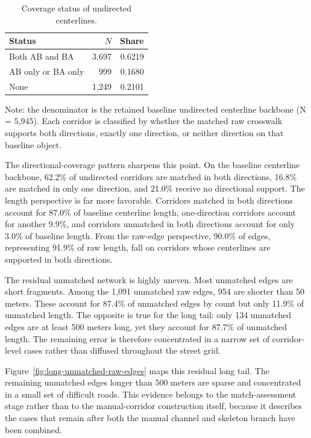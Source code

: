 \documentclass[12pt]{article}
\begin{document}
	\begin{table}[h!]
		\centering
		\caption{Coverage status of undirected centerlines.}
		\label{tab:undirected-coverage}
		\begin{tabular}{l r r}
			\toprule
			Status & $N$ & Share \\
			\midrule
			Both AB and BA & 3,697 & 0.6219 \\
			AB only or BA only & 999 & 0.1680 \\
			None & 1,249 & 0.2101 \\
			\bottomrule
		\end{tabular}
		\vspace{0.3em}
		\begin{minipage}{\textwidth}
			\footnotesize
			\raggedright
			Note: the denominator is the retained baseline undirected centerline backbone (N = 5,945). Each corridor is classified by whether the matched raw crosswalk supports both directions, exactly one direction, or neither direction on that baseline object.
		\end{minipage}
	\end{table}
	
	The directional-coverage pattern sharpens this point. On the baseline centerline backbone, 62.2\% of undirected corridors are matched in both directions, 16.8\% are matched in only one direction, and 21.0\% receive no directional support. The length perspective is far more favorable. Corridors matched in both directions account for 87.0\% of baseline centerline length, one-direction corridors account for another 9.9\%, and corridors unmatched in both directions account for only 3.0\% of baseline length. From the raw-edge perspective, 90.0\% of edges, representing 91.9\% of raw length, fall on corridors whose centerlines are supported in both directions.
	
	The residual unmatched network is highly uneven. Most unmatched edges are short fragments. Among the 1,091 unmatched raw edges, 954 are shorter than 50 meters. These account for 87.4\% of unmatched edges by count but only 11.9\% of unmatched length. The opposite is true for the long tail: only 134 unmatched edges are at least 500 meters long, yet they account for 87.7\% of unmatched length. The remaining error is therefore concentrated in a narrow set of corridor-level cases rather than diffused throughout the street grid.
	
	Figure~\ref{fig:long-unmatched-raw-edges} maps this residual long tail. The remaining unmatched edges longer than 500 meters are sparse and concentrated in a small set of difficult roads. This evidence belongs to the match-assessment stage rather than to the manual-corridor construction itself, because it describes the cases that remain after both the manual channel and skeleton branch have been combined.
	
\end{document}
